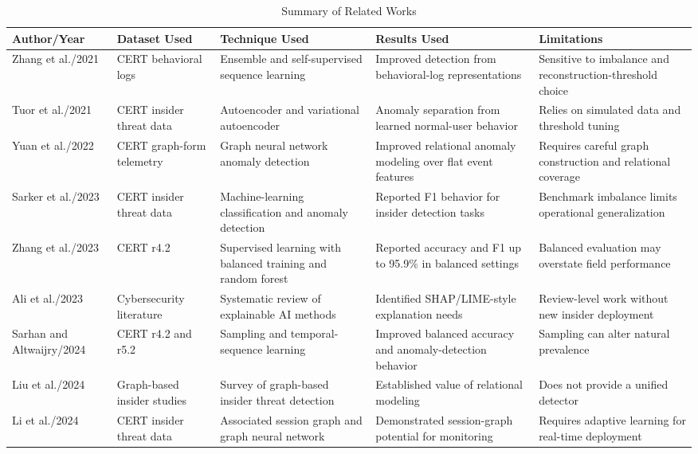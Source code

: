 \begin{table}[!tbp]
\caption{Summary of Related Works}
\label{tab:related_works}
\centering
\setlength{\tabcolsep}{3pt}
\renewcommand{\arraystretch}{1.15}
\begin{tabular}{p{}p{}p{}p{}p{}}
\toprule
Author/Year & Dataset Used & Technique Used & Results Used & Limitations \\
\midrule
Zhang et al./2021 \cite{zhang2021ensemble} & CERT behavioral logs & Ensemble and self-supervised sequence learning & Improved detection from behavioral-log representations & Sensitive to imbalance and reconstruction-threshold choice \\
Tuor et al./2021 \cite{tuor2021autoencoder} & CERT insider threat data & Autoencoder and variational autoencoder & Anomaly separation from learned normal-user behavior & Relies on simulated data and threshold tuning \\
Yuan et al./2022 \cite{yuan2022gnn} & CERT graph-form telemetry & Graph neural network anomaly detection & Improved relational anomaly modeling over flat event features & Requires careful graph construction and relational coverage \\
Sarker et al./2023 \cite{sarker2023insider} & CERT insider threat data & Machine-learning classification and anomaly detection & Reported F1 behavior for insider detection tasks & Benchmark imbalance limits operational generalization \\
Zhang et al./2023 \cite{zhang2023supervised} & CERT r4.2 & Supervised learning with balanced training and random forest & Reported accuracy and F1 up to 95.9\% in balanced settings & Balanced evaluation may overstate field performance \\
Ali et al./2023 \cite{ali2023xai} & Cybersecurity literature & Systematic review of explainable AI methods & Identified SHAP/LIME-style explanation needs & Review-level work without new insider deployment \\
Sarhan and Altwaijry/2024 \cite{balanced2024imbalance} & CERT r4.2 and r5.2 & Sampling and temporal-sequence learning & Improved balanced accuracy and anomaly-detection behavior & Sampling can alter natural prevalence \\
Liu et al./2024 \cite{liu2024graph} & Graph-based insider studies & Survey of graph-based insider threat detection & Established value of relational modeling & Does not provide a unified detector \\
Li et al./2024 \cite{asg2024} & CERT insider threat data & Associated session graph and graph neural network & Demonstrated session-graph potential for monitoring & Requires adaptive learning for real-time deployment \\

\end{tabular}
\end{table}

